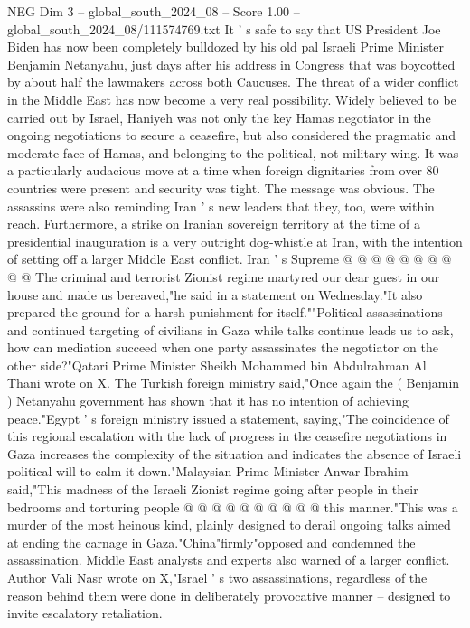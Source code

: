 \begin{textsample}{NEG Dim 3 – global\_south\_2024\_08 – Score 1.00 – global\_south\_2024\_08/111574769.txt}  \label{ex:f3_neg_127}
It ' s safe to say that US President Joe Biden has now been completely bulldozed by his old pal Israeli Prime Minister Benjamin Netanyahu, just days after his address in Congress that was boycotted by about half the lawmakers across both Caucuses.
The threat of a wider conflict in the Middle East has now become a very real possibility.
Widely believed to be carried out by Israel, Haniyeh was not only the key Hamas negotiator in the ongoing negotiations to secure a ceasefire, but also considered the pragmatic and moderate face of Hamas, and belonging to the political, not military wing.
It was a particularly audacious move at a time when foreign dignitaries from over 80 countries were present and security was tight.
The message was obvious.
The assassins were also reminding Iran ' s new leaders that they, too, were within reach.
Furthermore, a strike on Iranian sovereign territory at the time of a presidential inauguration is a very outright dog-whistle at Iran, with the intention of setting off a larger Middle East conflict.
Iran ' s Supreme @ @ @ @ @ @ @ @ @ @ The criminal and terrorist Zionist regime martyred our dear guest in our house and made us bereaved,"he said in a statement on Wednesday."It also prepared the ground for a harsh punishment for itself.""Political assassinations and continued targeting of civilians in Gaza while talks continue leads us to ask, how can mediation succeed when one party assassinates the negotiator on the other side?"Qatari Prime Minister Sheikh Mohammed bin Abdulrahman Al Thani wrote on X.
The Turkish foreign ministry said,"Once again the ( Benjamin ) Netanyahu government has shown that it has no intention of achieving peace."Egypt ' s foreign ministry issued a statement, saying,"The coincidence of this regional escalation with the lack of progress in the ceasefire negotiations in Gaza increases the complexity of the situation and indicates the absence of Israeli political will to calm it down."Malaysian Prime Minister Anwar Ibrahim said,"This madness of the Israeli Zionist regime going after people in their bedrooms and torturing people @ @ @ @ @ @ @ @ @ @ this manner."This was a murder of the most heinous kind, plainly designed to derail ongoing talks aimed at ending the carnage in Gaza."China"firmly"opposed and condemned the assassination.
Middle East analysts and experts also warned of a larger conflict.
Author Vali Nasr wrote on X,"Israel ' s two assassinations, regardless of the reason behind them were done in deliberately provocative manner -- designed to invite escalatory retaliation.

\end{textsample}
